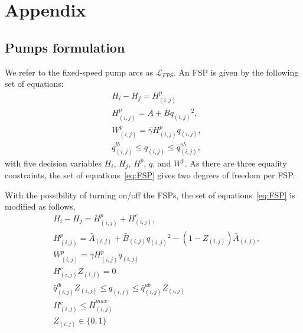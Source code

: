 \section{Appendix}
\subsection{Pumps formulation}
We refer to the fixed-speed pump arcs as $\mathcal{L}_{FPS}$. An FSP is given by the following set of equations:
\begin{subequations}\label{eq:FSP}
    \begin{alignat}{2} 
        & H_i - H_j = H^p_{(i,j)} \label{eq:FSP:energy_balance}
        \\
        &H^p_{(i,j)} = \bar{A} + \bar{B}{q_{(i,j)}}^2, \label{eq:FSP:QH}
        \\
        &W^p_{(i,j)} = \bar{\gamma} H^p_{(i,j)} q_{(i,j)}, \label{eq:FSP:hydraulic_power}
        \\
        &\bar{q}^{lb}_{(i,j)} \leq  q_{(i,j)} \leq \bar{q}^{ub}_{(i,j)},
    \end{alignat}
\end{subequations}
with five decision variables $H_i$, $H_j$, $H^p$, $q$, and $W^p$. As there are three equality constraints, the set of equations~\eqref{eq:FSP} gives two degrees of freedom per FSP\@. 
\par With the possibility of turning on/off the FSPs, the set of equations~\eqref{eq:FSP} is modified as follows,
\begin{subequations}\label{eq:FSP_int}
    \begin{alignat}{2}
        & H_i - H_j = H^p_{(i,j)} + H^c_{(i,j)}, \label{eq:FSP_on/off:energy_balance}
        \\
        & H^p_{(i,j)} = \bar{A}_{(i,j)} + \bar{B}_{(i,j)}{q_{(i,j)}}^2 - (1 - Z_{(i,j)})\bar{A}_{(i,j)}, \label{eq:FSP_on/off:QH}
        \\
        & W^p_{(i,j)} = \bar{\gamma} H^p_{(i,j)} q_{(i,j)} \label{eq:FSP_on/off:hydraulic_power}
        \\
        & H^c_{(i,j)}Z_{(i,j)} = 0
        \\
        & \bar {q}^{lb}_{(i,j)} Z_{(i,j)}  \leq  q_{(i,j)} \leq \bar{q}^{ub}_{(i,j)}Z_{(i,j)} \label{eq:FSP_qbounds}
        \\
        & H^c_{(i,j)} \leq \bar H^{max}_{(i,j)} \label{eq:FSP_checkbounds}
        \\
        & Z_{(i,j)} \in \{0,1\}
    \end{alignat}
\end{subequations}

